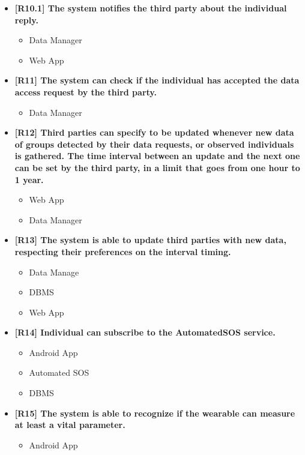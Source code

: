 \begin{itemize}
\item \textbf{[R10.1] The system notifies the third party about the individual reply.}
\begin{itemize}
\item Data Manager
\item Web App
\end{itemize}


\item \textbf{[R11] The system can check if the individual has accepted the data access request by the third party.}
\begin{itemize}
\item Data Manager
\end{itemize}

\item \textbf{[R12] Third parties can specify to be updated whenever new data of groups detected by their data requests, or observed individuals is gathered. The time interval between an update and the next one can be set by the third party, in a limit that goes from one hour to 1 year.}
\begin{itemize}
\item Web App
\item Data Manager
\end{itemize}


\item \textbf{[R13] The system is able to update third parties with new data, respecting their preferences on the interval timing.}
\begin{itemize}
\item Data Manage
\item DBMS
\item Web App
\end{itemize}

\item \textbf{[R14] Individual can subscribe to the AutomatedSOS service.}
\begin{itemize}
\item Android App
\item Automated SOS
\item DBMS
\end{itemize}


\item \textbf{[R15] The system is able to recognize if the wearable can measure at least a vital parameter.}
\begin{itemize}
\item Android App
\end{itemize}


\end{itemize}
